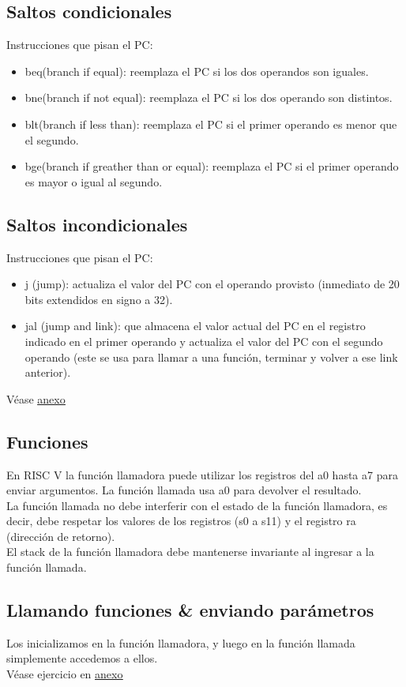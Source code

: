 \documentclass[10pt,a4paper]{article}
\begin{document}
\subsection*{Saltos condicionales}
Instrucciones que pisan el PC: 
\begin{itemize}
    \item beq(branch if equal): reemplaza el PC si los dos operandos son iguales.
    \item bne(branch if not equal): reemplaza el PC si los dos operando son distintos.
    \item blt(branch if less than): reemplaza el PC si el primer operando es menor que el segundo.
    \item bge(branch if greather than or equal): reemplaza el PC si el primer operando es mayor o igual al segundo.
\end{itemize}
\subsection*{Saltos incondicionales}
Instrucciones que pisan el PC: 
\begin{itemize}
    \item j (jump): actualiza el valor del PC con el operando provisto (inmediato de 20 bits extendidos en signo a 32).
    \item jal (jump and link): que almacena el valor actual del PC en el registro indicado en el primer operando y actualiza el valor del PC con el segundo operando (este se usa para llamar a una función, terminar y volver a ese link anterior).
\end{itemize}
Véase \hyperref[subsec:ejercicios_con_saltos_condicionales_incondicionales]{\underline{anexo}}
\subsection*{Funciones}
En RISC V la función llamadora puede utilizar los registros del a0 hasta a7 para enviar argumentos. La función llamada usa a0 para devolver el resultado. \\

La función llamada no debe interferir con el estado de la función llamadora, es decir, debe respetar los valores de los registros (s0 a s11) y el registro ra (dirección de retorno). \\

El stack de la función llamadora debe mantenerse invariante al ingresar a la función llamada.
\subsection*{Llamando funciones \& enviando parámetros}
Los inicializamos en la función llamadora, y luego en la función llamada simplemente accedemos a ellos. \\ 
Véase ejercicio en \hyperref[ejercicio:saltos_condicionales_argumentos]{\underline{anexo}}
\end{document}
